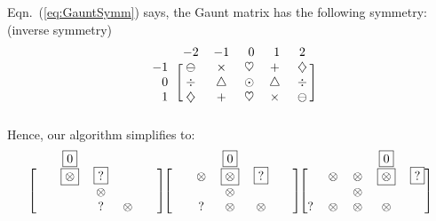 %
Eqn.~(\ref{eq:GauntSymm}) says, the Gaunt matrix has the following symmetry: (inverse symmetry)
\begin{equation*}
\begin{blockarray}{cccccc}
  & -2 & -1 & \ 0\ & \ 1\ & \ 2\ \\
\begin{block}{c[ccccc]}
 -1 & \ominus & \times & \heartsuit & + & \diamondsuit \\
\phantom{-}0 & \div & \triangle & \odot & \triangle & \div \\
\phantom{-}1 & \diamondsuit & + & \heartsuit & \times & \ominus \\
\end{block}
\end{blockarray}
\end{equation*}
%
Hence, our algorithm simplifies to:
\begin{equation*}
\begin{blockarray}{ccccc}
   & \boxed{0} &  &  &  \\
\begin{block}{[ccccc]}
   & \boxed{\otimes} & \boxed{?} &  &  \\
   &  & \otimes &  &  \\
 \phantom{\otimes} & \phantom{\otimes} & ? & \otimes & \phantom{\otimes} \\
\end{block}
\end{blockarray}
\begin{blockarray}{ccccc}
   &  & \boxed{0} &  &  \\
\begin{block}{[ccccc]}
   & \otimes & \boxed{\otimes} & \boxed{?} &  \\
   &  & \otimes &  &  \\
 \phantom{\otimes} & ? & \otimes & \otimes & \phantom{\otimes} \\
\end{block}
\end{blockarray}
\begin{blockarray}{ccccc}
   &  &  & \boxed{0}  &  \\
\begin{block}{[ccccc]}
   & \otimes & \otimes & \boxed{\otimes} & \boxed{?}  \\
   &  & \otimes &  &  \\
  ? & \otimes & \otimes & \otimes & \phantom{\otimes} \\
\end{block}
\end{blockarray}
\end{equation*}
